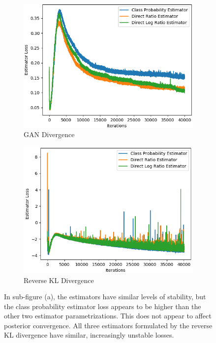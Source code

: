\documentclass[honours,12pt, twoside]{unswthesis}
\numberwithin{equation}{section}
\theoremstyle{definition}
\begin{document}
\newpage
\begin{figure}
\begin{subfigure}{0.49\textwidth}
\includegraphics[width=\linewidth]{estimator_losses/JCADVvsJCADVexpvsJCADVgudlog.png}
\caption{GAN Divergence}
\end{subfigure}
\begin{subfigure}{0.49\textwidth}
\includegraphics[width=\linewidth]{estimator_losses/JCKLDvsJCKLexpvsJCKLgudlog.png}
\caption{Reverse KL Divergence}
\end{subfigure}
\caption{\small In sub-figure (a), the estimators have similar levels of stability, but the class probability estimator loss appears to be higher than the other two estimator parametrizations. This does not appear to affect posterior convergence. All three estimators formulated by the reverse KL divergence have similar, increasingly unstable losses.}
\label{fig:6.6}
\end{figure}
\end{document}

